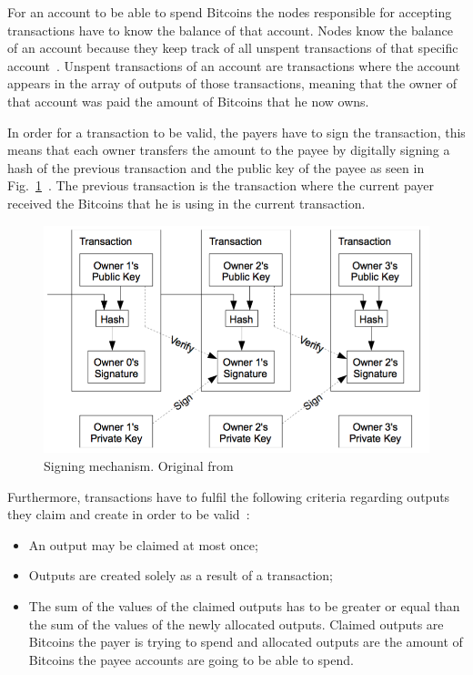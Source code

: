 For an account to be able to spend Bitcoins the nodes responsible for accepting transactions have to know the balance of that account. Nodes know the balance of an account because they keep track of all unspent transactions of that specific account~\cite{decker2013information}. Unspent transactions of an account are transactions where the account appears in the array of outputs of those transactions, meaning that the owner of that account was paid the amount of Bitcoins that he now owns.

In order for a transaction to be valid, the payers have to sign the transaction, this means that each owner transfers the amount to the payee by digitally signing a hash of the previous transaction and the public key of the payee as seen in Fig.~\ref{fig:signature}~\cite{nakamoto2008bitcoin}. The previous transaction is the transaction where the current payer received the Bitcoins that he is using in the current transaction.

\begin{figure}[h]
\centering
\includegraphics[scale=0.5]{figs/transactions}
\caption{Signing mechanism. Original from~\protect\cite{nakamoto2008bitcoin}}
\label{fig:signature}
\end{figure}

Furthermore, transactions have to fulfil the following criteria regarding outputs they claim and create in order to be valid~\cite{decker2013information}:
\begin{itemize}
  \item An output may be claimed at most once;
  \item Outputs are created solely as a result of a transaction;
  \item The sum of the values of the claimed outputs has to be greater or equal than the sum of the values of the newly allocated outputs. Claimed outputs are Bitcoins the payer is trying to spend and allocated outputs are the amount of Bitcoins the payee accounts are going to be able to spend.
\end{itemize}

